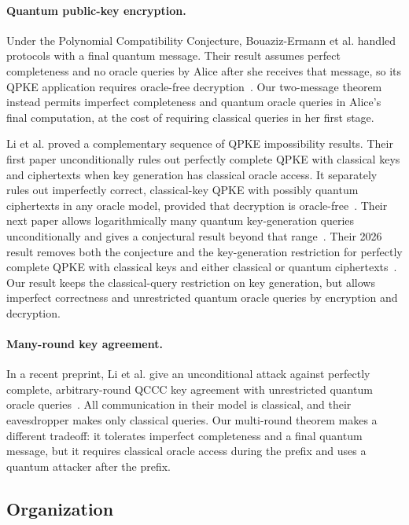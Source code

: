 \documentclass[11pt]{article}
\begin{document}
\paragraph{Quantum public-key encryption.}
Under the Polynomial Compatibility Conjecture, Bouaziz-Ermann et al. handled
protocols with a final quantum message. Their result assumes perfect
completeness and no oracle queries by Alice after she receives that message,
so its QPKE application requires oracle-free
decryption~\cite{BouazizEtAl24}. Our two-message theorem instead permits
imperfect completeness and quantum oracle queries in Alice's final
computation, at the cost of requiring classical queries in her first stage.

Li et al. proved a complementary sequence of QPKE impossibility results.
Their first paper unconditionally rules out perfectly complete QPKE with
classical keys and ciphertexts when key generation has classical oracle
access. It separately rules out imperfectly correct, classical-key QPKE with
possibly quantum ciphertexts in any oracle model, provided that decryption is
oracle-free~\cite{LiEtAl24}. Their next paper allows logarithmically many
quantum key-generation queries unconditionally and gives a conjectural
result beyond that range~\cite{LiEtAl25}. Their 2026 result removes both the
conjecture and the key-generation restriction for perfectly complete QPKE
with classical keys and either classical or quantum
ciphertexts~\cite{LiEtAl26PKE}. Our result keeps the classical-query
restriction on key generation, but allows imperfect correctness and
unrestricted quantum oracle queries by encryption and decryption.

\paragraph{Many-round key agreement.}
In a recent preprint, Li et al. give an unconditional attack against
perfectly complete, arbitrary-round QCCC key agreement with unrestricted
quantum oracle queries~\cite{LiEtAl26ManyRound}. All communication in their
model is classical, and their eavesdropper makes only classical queries. Our
multi-round theorem makes a different tradeoff: it tolerates imperfect
completeness and a final quantum message, but it requires classical oracle
access during the prefix and uses a quantum attacker after the prefix.

\subsection{Organization}
\end{document}
